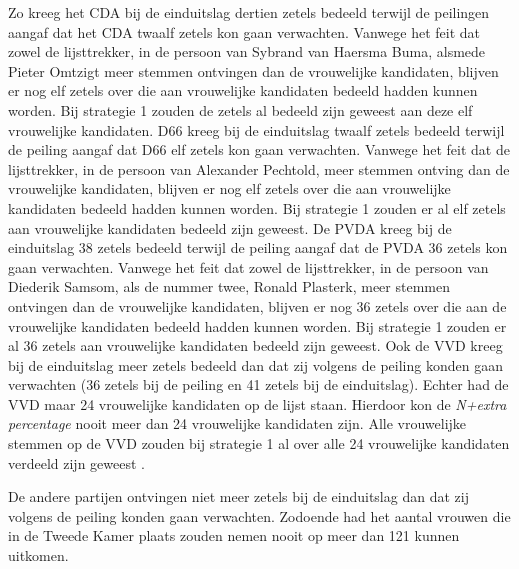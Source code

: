 Zo kreeg het CDA bij de einduitslag dertien zetels bedeeld terwijl de peilingen aangaf dat het CDA twaalf zetels kon gaan verwachten. Vanwege het feit dat zowel de lijsttrekker, in de persoon van Sybrand van Haersma Buma, alsmede Pieter Omtzigt meer stemmen ontvingen dan de vrouwelijke kandidaten, blijven er nog elf zetels over die aan vrouwelijke kandidaten bedeeld hadden kunnen worden. Bij strategie 1 zouden de zetels al bedeeld zijn geweest aan deze elf vrouwelijke kandidaten.
D66 kreeg bij de einduitslag twaalf zetels bedeeld terwijl de peiling aangaf dat D66 elf zetels kon gaan verwachten. Vanwege het feit dat de lijsttrekker, in de persoon van Alexander Pechtold, meer stemmen ontving dan de vrouwelijke kandidaten, blijven er nog elf zetels over die aan vrouwelijke kandidaten bedeeld hadden kunnen worden. Bij strategie 1 zouden er al elf zetels aan vrouwelijke kandidaten bedeeld zijn geweest. De PVDA kreeg bij de einduitslag 38 zetels bedeeld terwijl de peiling aangaf dat de PVDA 36 zetels kon gaan verwachten. Vanwege het feit dat zowel de lijsttrekker, in de persoon van Diederik Samsom, als de nummer twee, Ronald Plasterk, meer stemmen ontvingen dan de vrouwelijke kandidaten, blijven er nog 36 zetels over die aan de vrouwelijke kandidaten bedeeld hadden kunnen worden. Bij strategie 1 zouden er al 36 zetels aan vrouwelijke kandidaten bedeeld zijn geweest. Ook de VVD kreeg bij de einduitslag meer zetels bedeeld dan dat zij volgens de peiling konden gaan verwachten (36 zetels bij de peiling en 41 zetels bij de einduitslag). Echter had de VVD maar 24 vrouwelijke kandidaten op de lijst staan. Hierdoor kon de \textit{N+extra percentage} nooit meer dan 24 vrouwelijke kandidaten zijn. Alle vrouwelijke stemmen op de VVD zouden bij strategie 1 al over alle 24 vrouwelijke kandidaten verdeeld zijn geweest . 

De andere partijen ontvingen niet meer zetels bij de einduitslag dan dat zij volgens de peiling konden gaan verwachten. Zodoende had het aantal vrouwen die in de Tweede Kamer plaats zouden nemen nooit op meer dan 121 kunnen uitkomen.   





